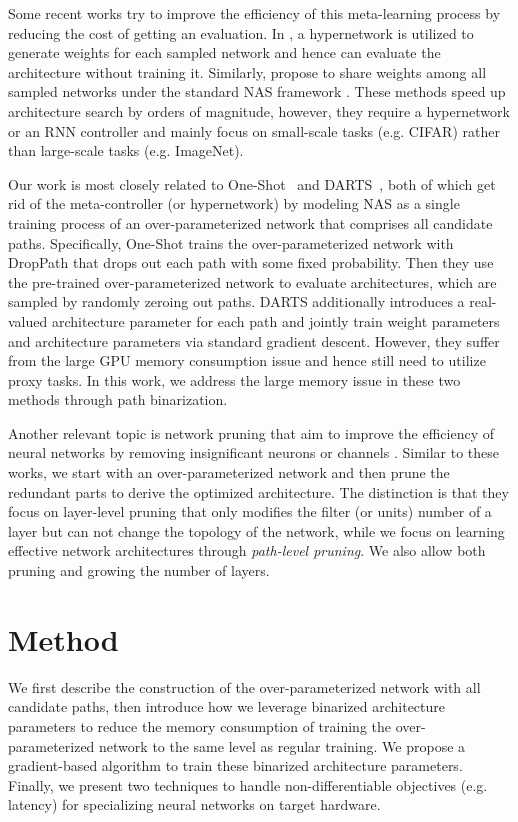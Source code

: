 \documentclass{article} \usepackage{iclr2019_conference,times}
\begin{document}
Some recent works \citep{brock2017smash,pham2018efficient} try to improve the efficiency of this meta-learning process by reducing the cost of getting an evaluation. In \cite{brock2017smash}, a hypernetwork is utilized to generate weights for each sampled network and hence can evaluate the architecture without training it. Similarly, \cite{pham2018efficient} propose to share weights among all sampled networks under the standard NAS framework \citep{zoph2016neural}. These methods speed up architecture search by orders of magnitude, however, they require a hypernetwork or an RNN controller and mainly focus on small-scale tasks (e.g. CIFAR) rather than large-scale tasks (e.g. ImageNet).

Our work is most closely related to One-Shot~\citep{bender2018understanding} and DARTS~\citep{liu2018darts}, both of which get rid of the meta-controller (or hypernetwork) by modeling NAS as a single training process of an over-parameterized network that comprises all candidate paths. Specifically, One-Shot trains the over-parameterized network with DropPath \citep{zoph2017learning} that drops out each path with some fixed probability. Then they use the pre-trained over-parameterized network to evaluate architectures, which are sampled by randomly zeroing out paths. DARTS additionally introduces a real-valued architecture parameter for each path and jointly train weight parameters and architecture parameters via standard gradient descent. However, they suffer from the large GPU memory consumption issue and hence still need to utilize proxy tasks. In this work, we address the large memory issue in these two methods through path binarization.

Another relevant topic is network pruning \citep{han2015deep} that aim to improve the efficiency of neural networks by removing insignificant neurons \citep{han2015learning} or channels \citep{liu2017learning}.
Similar to these works, we start with an over-parameterized network and then prune the redundant parts to derive the optimized architecture.  
The distinction is that they focus on layer-level pruning that only modifies the filter (or units) number of a layer but can not change the topology of the network, while we focus on learning effective network architectures through \emph{path-level pruning}. We also allow both pruning and growing the number of layers.

 
\section{Method}
We first describe the construction of the over-parameterized network with all candidate paths, then introduce how we leverage binarized architecture parameters to reduce the memory consumption of training the over-parameterized network to the same level as regular training. We propose a gradient-based algorithm to train these binarized architecture parameters. Finally, we present two techniques to handle non-differentiable objectives (e.g. latency) for specializing neural networks on target hardware.
\end{document}
